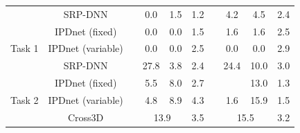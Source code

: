 \documentclass[lettersize,journal]{IEEEtran}
\begin{document}
\begin{table}[]
\begin{tabular}{cclccclccc}
                                                                          & SRP-DNN\cite{Yang2022SRPDNNLD}                               &  & 0.0                         & 1.5                                  & 1.2                                   &  & 4.2                                   & 4.5                                   & 2.4                         \\
                                                                          & \cellcolor[HTML]{EFEFEF}IPDnet (fixed)&  & \cellcolor[HTML]{EFEFEF}0.0 & \cellcolor[HTML]{EFEFEF}0.0 & \cellcolor[HTML]{EFEFEF}1.5 &  & \cellcolor[HTML]{EFEFEF}1.6           & \cellcolor[HTML]{EFEFEF}1.6           & \cellcolor[HTML]{EFEFEF}2.5          \\
\multirow{-5}{*}{Task 1}                                                  & \cellcolor[HTML]{EFEFEF}IPDnet (variable) &  & \cellcolor[HTML]{EFEFEF}0.0 & \cellcolor[HTML]{EFEFEF}0.0 & \cellcolor[HTML]{EFEFEF}2.5          &  & \cellcolor[HTML]{EFEFEF}0.0  & \cellcolor[HTML]{EFEFEF}0.0  & \cellcolor[HTML]{EFEFEF}2.9          \\ \midrule
                                                                          & SRP-DNN                                &  & 27.8                                 & 3.8                         & 2.4                          &  & 24.4                                  & 10.0                         & 3.0                                  \\
                                                                          & \cellcolor[HTML]{EFEFEF}IPDnet (fixed)&  & \cellcolor[HTML]{EFEFEF}5.5          & \cellcolor[HTML]{EFEFEF}8.0          & \cellcolor[HTML]{EFEFEF}2.7           &  & \cellcolor[HTML]{EFEFEF}{1.1}  & \cellcolor[HTML]{EFEFEF}13.0          & \cellcolor[HTML]{EFEFEF}1.3 \\
\multirow{-3}{*}{Task 2}                                                  & \cellcolor[HTML]{EFEFEF}IPDnet (variable) &  & \cellcolor[HTML]{EFEFEF}4.8 & \cellcolor[HTML]{EFEFEF}8.9          & \cellcolor[HTML]{EFEFEF}4.3           &  & \cellcolor[HTML]{EFEFEF}1.6           & \cellcolor[HTML]{EFEFEF}15.9          & \cellcolor[HTML]{EFEFEF}1.5          \\ \midrule
                                                                          & Cross3D                                &  & \multicolumn{2}{c}{13.9}                                                    & 3.5                                   &  & \multicolumn{2}{c}{15.5}                                                      & 3.2                                  \\

\end{tabular}
\end{table}
\end{document}

